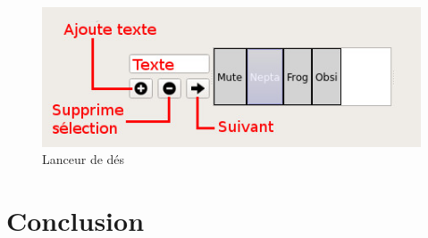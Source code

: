 \documentclass[11pt]{article}
\begin{document}
\begin{figure}[h!]
	\centering
	\includegraphics[scale=0.7]{img/turn_manager.jpg}
	\caption{Lanceur de dés}
\end{figure}

\section{Conclusion}
\end{document}
